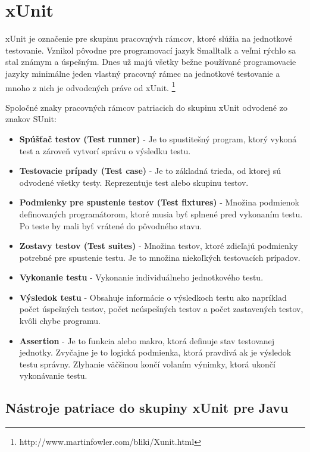 \documentclass[11pt,twoside,slovak,a4paper]{article}
\begin{document}
	\newpage
	\section{xUnit}
		xUnit je označenie pre skupinu pracovnývh rámcov, ktoré slúžia na jednotkové testovanie. Vznikol pôvodne pre programovací jazyk Smalltalk a veľmi rýchlo sa stal známym a úspešným. Dnes už majú všetky bežne používané programovacie jazyky minimálne jeden vlastný pracovný rámec na jednotkové testovanie a mnoho z nich je odvodených práve od xUnit. 		\footnote{http://www.martinfowler.com/bliki/Xunit.html} \newline

		Spoločné znaky pracovných rámcov patriacich do skupinu xUnit odvodené zo znakov SUnit\cite{Brauer}:
		\begin{itemize}
			\item \textbf{Spúšťač testov (Test runner)} - Je to spustitešný program, ktorý vykoná test a zároveň vytvorí správu o výsledku testu.
			\item \textbf{Testovacie prípady (Test case)} - Je to základná trieda, od ktorej sú odvodené všetky testy. Reprezentuje test alebo skupinu testov.
			\item \textbf{Podmienky pre spustenie testov (Test fixtures)} - Množina podmienok definovaných programátorom, ktoré musia byť splnené pred vykonaním testu. Po teste by mali byť vrátené do pôvodného stavu.
			\item \textbf{Zostavy testov (Test suites)} - Množina testov, ktoré zdieľajú podmienky potrebné pre spustenie testu. Je to množina niekoľkých testovacích prípadov.
			\item \textbf{Vykonanie testu} - Vykonanie individuálneho jednotkového testu.
			\item \textbf{Výsledok testu} - Obsahuje informácie o výsledkoch testu ako napríklad počet úspešných testov, počet neúspešných testov a počet zastavených testov, kvôli chybe programu.
			\item \textbf{Assertion} - Je to funkcia alebo makro, ktorá definuje stav testovanej jednotky. Zvyčajne je to logická podmienka, ktorá pravdivá ak je výsledok testu správny. Zlyhanie väčšinou končí volaním výnimky, ktorá ukončí vykonávanie testu. 
		\end{itemize}
		
	\subsection{Nástroje patriace do skupiny xUnit pre Javu}
\end{document}
